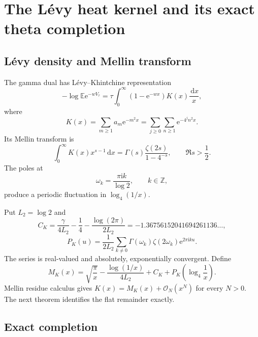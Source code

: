 \documentclass[11pt,oneside]{article}
\theoremstyle{definition}
\theoremstyle{remark}
\newcommand{\Z}{\mathbb Z}
\newcommand{\e}{\mathrm e}
\newcommand{\ii}{\mathrm i}
\newcommand{\dd}{\,\mathrm d}
\newcommand{\E}{\mathbb E}
\newcommand{\bigO}{\mathcal O}
\begin{document}
\section{The L\'evy heat kernel and its exact theta completion}

\subsection{L\'evy density and Mellin transform}

The gamma dual has L\'evy--Khintchine representation
\begin{equation}\label{eq:Levy-Khintchine}
 -\log\E\e^{-wV_\tau}
 =\tau\int_0^\infty(1-\e^{-wx})K(x)\frac{\dd x}{x},
\end{equation}
where
\begin{equation}\label{eq:K-def}
 K(x)=\sum_{m\ge1}a_m\e^{-m^2x}
 =\sum_{j\ge0}\sum_{n\ge1}\e^{-4^jn^2x}.
\end{equation}
Its Mellin transform is
\begin{equation}\label{eq:K-Mellin}
 \int_0^\infty K(x)x^{s-1}\dd x
 =\Gamma(s)\frac{\zeta(2s)}{1-4^{-s}},
 \qquad \Re s>\frac12.
\end{equation}
The poles at
\begin{equation}\label{eq:omega-k}
 \omega_k=\frac{\pi\ii k}{\log2},\qquad k\in\Z,
\end{equation}
produce a periodic fluctuation in $\log_4(1/x)$.

Put $L_2=\log2$ and
\begin{equation}\label{eq:CK}
 C_K=\frac{\gamma}{4L_2}-\frac14-
 \frac{\log(2\pi)}{2L_2}
 =-1.36756152041694261136\ldots,
\end{equation}
\begin{equation}\label{eq:PK}
 P_K(u)=\frac1{2L_2}\sum_{k\ne0}
 \Gamma(\omega_k)\zeta(2\omega_k)\e^{2\pi\ii ku}.
\end{equation}
The series is real-valued and absolutely, exponentially convergent.
Define
\begin{equation}\label{eq:MK}
 M_K(x)=\sqrt{\frac\pi x}
 -\frac{\log(1/x)}{4L_2}+C_K
 +P_K\!\left(\log_4\frac1x\right).
\end{equation}
Mellin residue calculus gives $K(x)=M_K(x)+\bigO_N(x^N)$ for every $N>0$.
The next theorem identifies the flat remainder exactly.

\subsection{Exact completion}
\end{document}
